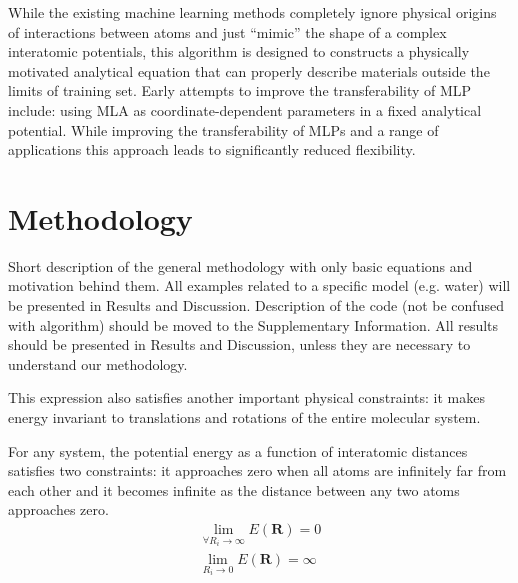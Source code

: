 \documentclass[aps,prl,reprint,amsmath,amssymb,nature]{revtex4-1}
\begin{document}
While the existing machine learning methods completely ignore physical origins of interactions between atoms and just ``mimic'' the shape of a complex interatomic potentials, this algorithm is designed to constructs a physically motivated analytical equation that can properly describe materials outside the limits of training set. 
\red Early attempts to improve the transferability of MLP include: using MLA as coordinate-dependent parameters in a fixed analytical potential. 
While improving the transferability of MLPs and a range of applications this approach leads to significantly reduced flexibility.\old


\section{Methodology}

\red Short description of the general methodology with only basic equations and motivation behind them. All examples related to a specific model (e.g. water) will be presented in Results and Discussion. Description of the code (not be confused with algorithm) should be moved to the Supplementary Information. All results should be presented in Results and Discussion, unless they are necessary to understand our methodology. \old

This expression also satisfies another important physical constraints: it makes energy invariant to translations and rotations of the entire molecular system. 

For any system, the potential energy as a function of interatomic distances satisfies two constraints: it approaches zero when all atoms are infinitely far from each other and it becomes infinite as the distance between any two atoms approaches zero.
%
\begin{eqnarray}
\lim_{\forall R_i \rightarrow \infty} E (\mathbf{R}) = 0 \\
\lim_{R_i \rightarrow 0} E (\mathbf{R}) = \infty
\end{eqnarray}
\end{document}
